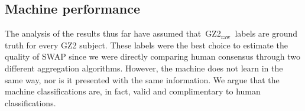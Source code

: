 \documentclass[twocolumn]{aastex6}
\newcommand{\feat}{`Featured'}
\newcommand{\raw}{GZ2$_{\text{raw}}$}
\begin{document}

\subsection{Machine performance}\label{sec: machine performance}

The analysis of the results thus far have assumed that~\raw~labels are ground
 truth for every GZ2 subject. These labels were the best choice to estimate the
quality of SWAP since we were directly comparing 
human consensus through two different aggregation algorithms.
However, the machine does not learn in the same way, nor is it presented with the 
same information. We argue that the machine classifications are, in fact, valid 
and complimentary to human classifications. 
\end{document}
